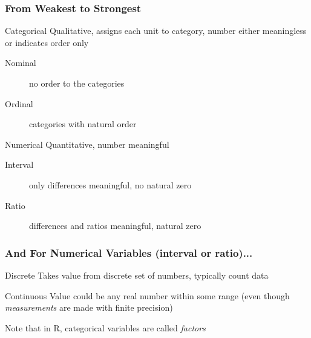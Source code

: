 \begin{frame}
\frametitle{From Weakest to Strongest}
\begin{block}{Categorical}
Qualitative, assigns each unit to category, number either meaningless or indicates order only \pause
		\begin{description}
			\item[Nominal] no order to the categories  \pause
			\item[Ordinal]  categories with natural order \pause
		\end{description}
\end{block}
\begin{block}{Numerical}
Quantitative, number meaningful \pause
		\begin{description}
			\item[Interval] only differences meaningful, no natural zero \pause
			\item[Ratio] differences and ratios meaningful, natural zero 
		\end{description}
\end{block}

\end{frame}


\begin{frame}
\frametitle{And For Numerical Variables (interval or ratio)...}
\begin{block}{Discrete}
Takes value from discrete set of numbers, typically count data
\end{block}
\pause
\begin{block}{Continuous}
Value could be any real number within some range (even though \emph{measurements} are made with finite precision)
\end{block}

\end{frame}

\begin{frame}
\begin{center}
\Huge
Note that in R, categorical variables are called \emph{factors}
\end{center}
\end{frame}

